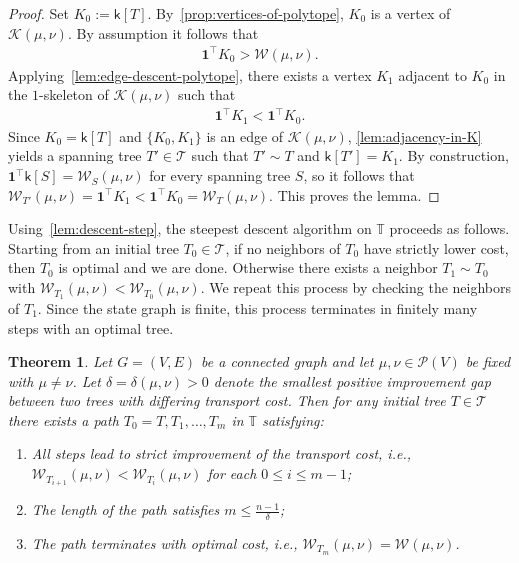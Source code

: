 \documentclass[10pt,a4paper]{amsart}
\newcommand{\prob}{{\mathscr{P}}}
\newcommand{\wass}{{\mathcal{W}}}
\newcommand{\setoftrees}{{\mathcal{T}}}
\newcommand{\stategraph}{{\mathbb{T}}}
\newcommand{\embedding}{{\mathsf{k}}}
\newcommand{\flowpoly}{{\mathcal{K}}}
\newtheorem{theorem}{Theorem}[section]
\begin{document}
\begin{proof}
    Set $K_0:=\embedding[T]$. By~\cref{prop:vertices-of-polytope}, $K_0$ is a vertex of $\flowpoly(\mu,\nu)$. By assumption it follows that
        \begin{align*}
            \mathbf{1}^{\top}K_0 > \wass(\mu,\nu).
        \end{align*}
    Applying~\cref{lem:edge-descent-polytope}, there exists a vertex $K_1$ adjacent to $K_0$ in the $1$-skeleton of $\flowpoly(\mu,\nu)$ such that
        \begin{align*}
            \mathbf{1}^{\top}K_1 < \mathbf{1}^{\top}K_0.
        \end{align*}
    Since $K_0=\embedding[T]$ and $\{K_0,K_1\}$ is an edge of $\flowpoly(\mu,\nu)$, \cref{lem:adjacency-in-K} yields a spanning tree $T'\in\setoftrees$ such that $T'\sim T$ and $\embedding[T']=K_1$. By construction, $\mathbf{1}^{\top}\embedding[S]=\wass_S(\mu,\nu)$ for every spanning tree $S$, so it follows that $\wass_{T'}(\mu,\nu)=\mathbf{1}^{\top}K_1<\mathbf{1}^{\top}K_0=\wass_T(\mu,\nu)$. This proves the lemma.
\end{proof}

Using~\cref{lem:descent-step}, the steepest descent algorithm on $\stategraph$ proceeds as follows. Starting from an initial tree $T_0\in\setoftrees$, if no neighbors of $T_0$ have strictly lower cost, then $T_0$ is optimal and we are done. Otherwise there exists a neighbor $T_1\sim T_0$ with $\wass_{T_1}(\mu,\nu) < \wass_{T_0}(\mu,\nu)$. We repeat this process by checking the neighbors of $T_1$. Since the state graph is finite, this process terminates in finitely many steps with an optimal tree. 


\begin{theorem}\label{thm:steepest-descent-convergence}
    Let $G=(V,E)$ be a connected graph and let $\mu,\nu\in\prob(V)$ be fixed with $\mu\ne \nu$. Let $\delta = \delta(\mu,\nu) > 0$ denote the smallest positive improvement gap between two trees with differing transport cost. Then for any initial tree $T\in\setoftrees$ there exists a path $T_0=T,T_1,\dotsc, T_{m}$ in $\stategraph$ satisfying:
        \begin{enumerate}
            \item All steps lead to strict improvement of the transport cost, i.e., $\wass_{T_{i+1}}(\mu,\nu) < \wass_{T_i}(\mu,\nu)$ for each $0\le i \le m-1$;
            \item The length of the path satisfies $m\leq \frac{n-1}{\delta}$;
            \item The path terminates with optimal cost, i.e., $\wass_{T_m}(\mu,\nu) = \wass(\mu,\nu)$.
        \end{enumerate}
\end{theorem}
\end{document}
